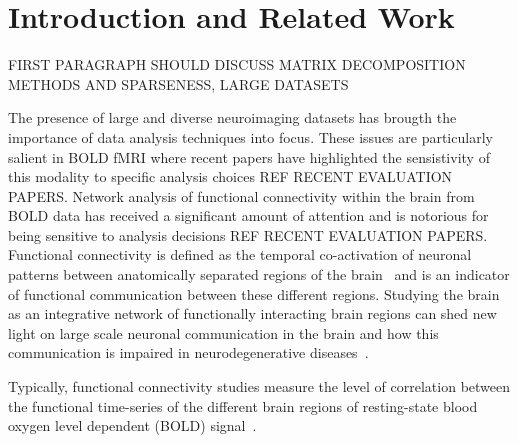 \documentclass{llncs}
\begin{document}
\section{Introduction and Related Work}
FIRST PARAGRAPH SHOULD DISCUSS MATRIX DECOMPOSITION METHODS AND SPARSENESS, LARGE DATASETS

The presence of large and diverse neuroimaging datasets has brougth the importance of data analysis techniques into focus.  These issues are particularly salient in BOLD fMRI where recent papers have highlighted the sensistivity of this modality to specific analysis choices REF RECENT EVALUATION PAPERS.  Network analysis of functional connectivity within the brain from BOLD data has received a significant amount of attention and is notorious for being sensitive to analysis decisions REF RECENT EVALUATION PAPERS. Functional connectivity is defined as the temporal co-activation of neuronal patterns between anatomically separated regions of the brain~\cite{aertsen1989dynamics} and is an indicator of functional communication between these different regions.  Studying the brain as an integrative network of functionally interacting brain regions can shed new light on large scale neuronal communication in the brain and how this communication is impaired in neurodegenerative diseases~\cite{bullmore2009complex,mohammadi2009changes,seeley2009neurodegenerative}. 

Typically, functional connectivity studies measure the level of correlation between the functional time-series of the different brain regions of resting-state blood oxygen level dependent (BOLD) signal~\cite{biswal1997simultaneous,damoiseaux2006consistent,salvador2005neurophysiological}.
\end{document}
